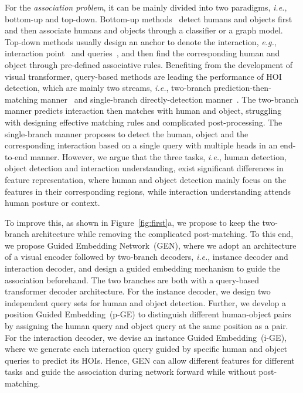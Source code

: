 \documentclass[10pt,twocolumn,letterpaper]{article}
\begin{document}
For the \emph{association problem}, it can be mainly divided into two paradigms, \emph{i.e.}, bottom-up and top-down. Bottom-up methods~\cite{li2018transferable,gao2018ican,Gao-ECCV-DRG} detect humans and objects first and then associate humans and objects through a classifier or a graph model. Top-down methods usually design an anchor to denote the interaction, \emph{e.g.}, interaction point~\cite{liao2020ppdm} and queries~\cite{tamura2021qpic,zou2021_hoitrans,chen_2021_asnet}, and then find the corresponding human and object through pre-defined associative rules.  Benefiting from the development of visual transformer, query-based methods are leading the performance of HOI detection, which are mainly two streams, \emph{i.e.}, two-branch prediction-then-matching manner~\cite{chen_2021_asnet} and single-branch directly-detection manner~\cite{tamura2021qpic,zou2021_hoitrans}. The two-branch manner predicts interaction then matches with human and object, struggling with designing effective matching rules and complicated post-processing. The single-branch manner proposes to detect the human, object and the corresponding interaction based on a single query with multiple heads in an end-to-end manner. However, we argue that the three tasks, \emph{i.e.}, human detection, object detection and interaction understanding, exist significant differences in feature representation, where human and object detection mainly focus on the features in their corresponding regions, while interaction understanding attends human posture or context. 

To improve this, as shown in Figure~\ref{fig:first}a, we propose to keep the two-branch architecture while removing the complicated post-matching. To this end, we propose Guided Embedding Network~(GEN), where we adopt an architecture of a visual encoder followed by two-branch decoders, \emph{i.e.}, instance decoder and interaction decoder, and design a guided embedding mechanism to guide the association beforehand. The two branches are both with a query-based transformer decoder architecture. For the instance decoder, we design two independent query sets for human and object detection. Further, we develop a position Guided Embedding~(p-GE) to distinguish different human-object pairs by assigning the human query and object query at the same position as a pair. For the interaction decoder, we devise an instance Guided Embedding~(i-GE), where we generate each interaction query guided by specific human and object queries to predict its HOIs. Hence, GEN can allow different features for different tasks and guide the association during network forward while without post-matching.
\end{document}
